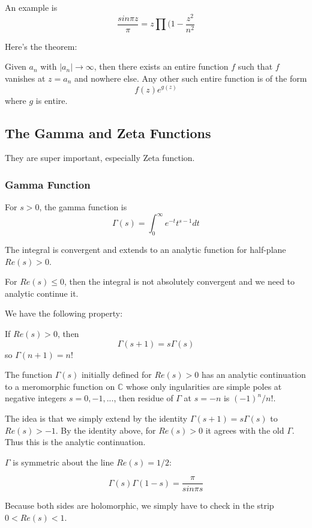 \documentclass[main.tex]{subfiles}
\begin{document}
An example is 
$$
\frac{sin \pi z}{\pi } = z \prod (1 - \frac{z^2}{n^2}
$$

Here's the theorem:
\begin{theorem}
Given $a_n$ with $|a_n| \rightarrow \infty$, then there exists an entire function $f$ such that $f$ vanishes at $z = a_n$ and nowhere else. Any other such entire function is of the form 
$$
f(z) e^{g(z)}
$$
where $g$ is entire.
\end{theorem}


\subsection{The Gamma and Zeta Functions}
They are super important, especially Zeta function.

\subsubsection{Gamma Function}
For $s > 0$, the gamma function is 
$$
\Gamma(s) = \int_0 ^{\infty} e^{-t} t^{s-1} dt
$$

The integral is convergent and extends to an analytic function for half-plane $Re(s) > 0$.

For $Re(s) \leq 0$, then the integral is not absolutely convergent and we need to analytic continue it.

We have the following property:
\begin{lemma}
If $Re(s) > 0$, then 
$$
\Gamma(s+ 1) = s \Gamma(s)
$$
so $\Gamma(n+1) = n!$
\end{lemma}

\begin{theorem}
The function $\Gamma(s)$ initially defined for $Re(s) > 0$ has an analytic continuation to a meromorphic function on $\mathbb{C}$ whose only ingularities are simple poles at negative integers $s = 0, -1, ... $, then residue of $\Gamma$ at $s = -n$ is $(-1)^n /n!$.
\end{theorem}
The idea is that we simply extend by the identity $\Gamma(s+ 1) = s \Gamma(s)$ to $Re(s) > -1$. By the identity above, for $Re(s) > 0$ it agrees with the old $\Gamma$. Thus this is the analytic continuation.

$\Gamma$ is symmetric about the line $Re(s) = 1/2$:

\begin{theorem}
$$
\Gamma(s) \Gamma(1-s) = \frac{\pi}{sin \pi s}
$$
\end{theorem}
Because both sides are holomorphic, we simply have to check in the strip $0 < Re(s) < 1$.
\end{document}

